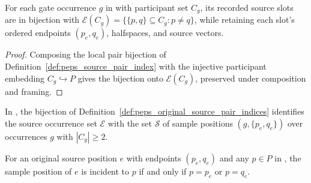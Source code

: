 \begin{definition}
    \label{def:peps_original_source_pair_indices}
    \leanok
    For each gate occurrence $g$ in
    \cite[proof of Theorem~5.2]{OpenAI2026PolynomialPEPS} with participant set
    $C_g$, its recorded source slots are in bijection with
    $\mathcal E(C_g)=\{\{p,q\}\subseteq C_g:p\neq q\}$, while retaining each
    slot's ordered endpoints $(p_e,q_e)$, halfspaces, and source vectors.
\end{definition}
\begin{proof}\leanok
    Composing the local pair bijection of Definition~\ref{def:peps_source_pair_index}
    with the injective participant embedding $C_g\hookrightarrow P$ gives the
    bijection onto $\mathcal E(C_g)$, preserved under composition and framing.
\end{proof}

\begin{definition}
    \label{def:peps_original_source_sample_indices}
    \leanok
    In \cite[proof of Theorem~5.2]{OpenAI2026PolynomialPEPS}, the bijection of
    Definition~\ref{def:peps_original_source_pair_indices} identifies the source
    occurrence set $\mathcal E$ with the set $\mathcal S$ of sample positions
    $(g,\{p_e,q_e\})$ over occurrences $g$ with $|C_g|\ge 2$.
\end{definition}


\begin{lemma}
    \label{thm:peps_original_source_sample_incidence}
    \leanok
    For an original source position $e$ with endpoints $(p_e,q_e)$ and any
    $p\in P$ in \cite[proof of Theorem~5.2]{OpenAI2026PolynomialPEPS}, the
    sample position of $e$ is incident to $p$ if and only if $p=p_e$ or $p=q_e$.
\end{lemma}

